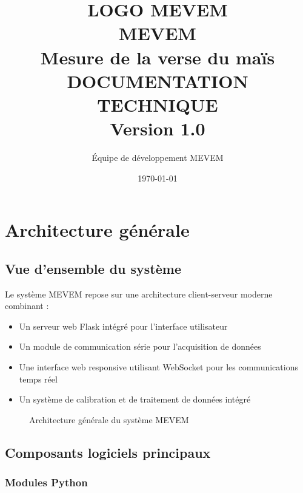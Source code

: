\documentclass[12pt,a4paper]{article}
\title{%
    \vspace{-2cm}
    {\Large LOGO MEVEM}\\[1cm]
    {\Huge \textbf{MEVEM}}\\[0.5cm]
    {\Large Mesure de la verse du maïs}\\[0.3cm]
    {\Large \textbf{DOCUMENTATION TECHNIQUE}}\\[0.5cm]
    {\normalsize Version 1.0}
}
\author{Équipe de développement MEVEM}
\date{\today}
\begin{document}
\maketitle
\thispagestyle{empty}

\newpage
\tableofcontents
\newpage

\section{Architecture générale}

\subsection{Vue d'ensemble du système}

Le système MEVEM repose sur une architecture client-serveur moderne combinant :
\begin{itemize}
    \item Un serveur web Flask intégré pour l'interface utilisateur
    \item Un module de communication série pour l'acquisition de données
    \item Une interface web responsive utilisant WebSocket pour les communications temps réel
    \item Un système de calibration et de traitement de données intégré
\end{itemize}

\begin{figure}[H]
    \centering
    \caption{Architecture générale du système MEVEM}
    \label{fig:architecture}
\end{figure}

\subsection{Composants logiciels principaux}

\subsubsection{Modules Python}
\end{document}
